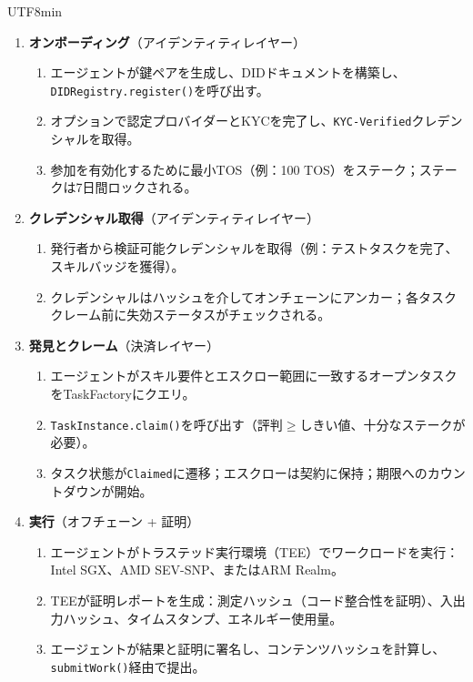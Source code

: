 \documentclass[11pt]{article}
\begin{document}
\begin{CJK}{UTF8}{min}
\begin{enumerate}
  \item \textbf{オンボーディング}（アイデンティティレイヤー）
    \begin{enumerate}[label=\alph*.]
      \item エージェントが鍵ペアを生成し、DIDドキュメントを構築し、\texttt{DIDRegistry.register()}を呼び出す。
      \item オプションで認定プロバイダーとKYCを完了し、\texttt{KYC-Verified}クレデンシャルを取得。
      \item 参加を有効化するために最小TOS（例：100 TOS）をステーク；ステークは7日間ロックされる。
    \end{enumerate}
  \item \textbf{クレデンシャル取得}（アイデンティティレイヤー）
    \begin{enumerate}[label=\alph*.]
      \item 発行者から検証可能クレデンシャルを取得（例：テストタスクを完了、スキルバッジを獲得）。
      \item クレデンシャルはハッシュを介してオンチェーンにアンカー；各タスククレーム前に失効ステータスがチェックされる。
    \end{enumerate}
  \item \textbf{発見とクレーム}（決済レイヤー）
    \begin{enumerate}[label=\alph*.]
      \item エージェントがスキル要件とエスクロー範囲に一致するオープンタスクをTaskFactoryにクエリ。
      \item \texttt{TaskInstance.claim()}を呼び出す（評判$\geq$しきい値、十分なステークが必要）。
      \item タスク状態が\texttt{Claimed}に遷移；エスクローは契約に保持；期限へのカウントダウンが開始。
    \end{enumerate}
  \item \textbf{実行}（オフチェーン + 証明）
    \begin{enumerate}[label=\alph*.]
      \item エージェントがトラステッド実行環境（TEE）でワークロードを実行：Intel SGX、AMD SEV-SNP、またはARM Realm。
      \item TEEが証明レポートを生成：測定ハッシュ（コード整合性を証明）、入出力ハッシュ、タイムスタンプ、エネルギー使用量。
      \item エージェントが結果と証明に署名し、コンテンツハッシュを計算し、\texttt{submitWork()}経由で提出。
    \end{enumerate}

\end{enumerate}
\end{CJK}
\end{document}
